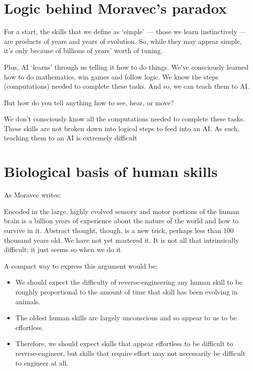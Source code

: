 \documentclass[a4paper,10pt]{article} %
\begin{document}
\section{Logic behind Moravec’s paradox}
For a start, the skills that we define as ‘simple’ — those we learn instinctively — are products of years and years of evolution. So, while they may appear simple, it’s only because of billions of years’ worth of tuning.

Plus, AI ‘learns’ through us telling it how to do things. We’ve consciously learned how to do mathematics, win games and follow logic. We know the steps (computations) needed to complete these tasks. And so, we can teach them to AI.

But how do you tell anything how to see, hear, or move?

We don’t consciously know all the computations needed to complete these tasks. These skills are not broken down into logical steps to feed into an AI. As such, teaching them to an AI is extremely difficult

\section{Biological basis of human skills}

As Moravec writes:

Encoded in the large, highly evolved sensory and motor portions of the human brain is a billion years of experience about the nature of the world and how to survive in it. Abstract thought, though, is a new trick, perhaps less than 100 thousand years old. We have not yet mastered it. It is not all that intrinsically difficult; it just seems so when we do it.

A compact way to express this argument would be:
\begin{itemize}
    \item We should expect the difficulty of reverse-engineering any human skill to be roughly proportional to the amount of time that skill has been evolving in animals.
    \item The oldest human skills are largely unconscious and so appear to us to be effortless.
    \item Therefore, we should expect skills that appear effortless to be difficult to reverse-engineer, but skills that require effort may not necessarily be difficult to engineer at all.
\end{itemize}
\end{document}
